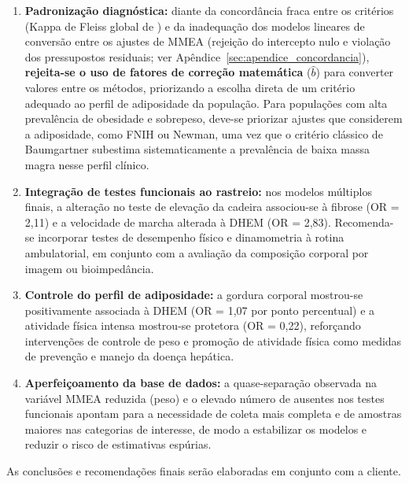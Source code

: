 \documentclass[11pt,a4paper]{article}
\begin{document}
\begin{enumerate}
  \item \textbf{Padronização diagnóstica:} diante da concordância fraca entre
        os critérios (Kappa de Fleiss global de \KappaFleiss{}) e da
        inadequação dos modelos lineares de conversão entre os ajustes de MMEA
        (rejeição do intercepto nulo e violação dos pressupostos residuais;
        ver Apêndice~\ref{sec:apendice_concordancia}), \textbf{rejeita-se o uso
        de fatores de correção matemática} ($\hat{b}$) para converter valores
        entre os métodos, priorizando a escolha direta de um critério adequado
        ao perfil de adiposidade da população. Para populações com alta
        prevalência de obesidade e sobrepeso, deve-se priorizar ajustes que
        considerem a adiposidade, como FNIH ou Newman, uma vez que o critério
        clássico de Baumgartner subestima sistematicamente a prevalência de
        baixa massa magra nesse perfil clínico.
  \item \textbf{Integração de testes funcionais ao rastreio:} nos modelos
        múltiplos finais, a alteração no teste de elevação da cadeira associou-se
        à fibrose (OR = 2,11) e a velocidade de marcha alterada à DHEM
        (OR = 2,83). Recomenda-se incorporar testes de desempenho físico e
        dinamometria à rotina ambulatorial, em conjunto com a avaliação da
        composição corporal por imagem ou bioimpedância.
  \item \textbf{Controle do perfil de adiposidade:} a gordura corporal
        mostrou-se positivamente associada à DHEM (OR = 1,07 por ponto
        percentual) e a atividade física intensa mostrou-se protetora
        (OR = 0,22), reforçando intervenções de controle de peso e promoção de
        atividade física como medidas de prevenção e manejo da doença hepática.
  \item \textbf{Aperfeiçoamento da base de dados:} a quase-separação observada
        na variável MMEA reduzida (peso) e o elevado número de ausentes nos
        testes funcionais apontam para a necessidade de coleta mais completa e
        de amostras maiores nas categorias de interesse, de modo a estabilizar
        os modelos e reduzir o risco de estimativas espúrias.
\end{enumerate}

As conclusões e recomendações finais serão elaboradas em conjunto com a
cliente.
\end{document}
